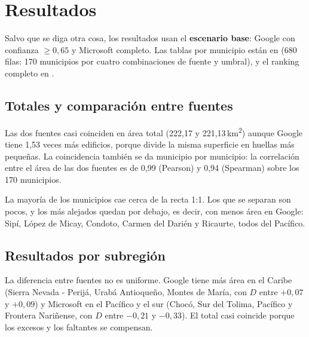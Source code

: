 \section{Resultados}
\label{sec:resultados}

Salvo que se diga otra cosa, los resultados usan el \textbf{escenario base}:
Google con confianza $\geq 0{,}65$ y Microsoft completo. Las tablas por
municipio están en  (680 filas:
170 municipios por cuatro combinaciones de fuente y umbral), y el ranking
completo en .

\subsection{Totales y comparación entre fuentes}

Las dos fuentes casi coinciden en área total (222,17 y
221,13\,km\textsuperscript{2}) aunque Google tiene 1,53 veces más edificios,
porque divide la misma superficie en huellas más pequeñas. La coincidencia
también se da municipio por municipio: la correlación entre el área de las dos
fuentes es de 0,99 (Pearson) y 0,94 (Spearman) sobre los 170 municipios.


La mayoría de los municipios cae cerca de la recta 1:1. Los que se separan son
pocos, y los más alejados quedan por debajo, es decir, con menos área en
Google: Sipí, López de Micay, Condoto, Carmen del Darién y Ricaurte, todos del
Pacífico.

\subsection{Resultados por subregión}


La diferencia entre fuentes no es uniforme. Google tiene más área en el Caribe
(Sierra Nevada - Perijá, Urabá Antioqueño, Montes de María, con $D$ entre
$+0{,}07$ y $+0{,}09$) y Microsoft en el Pacífico y el sur (Chocó, Sur del
Tolima, Pacífico y Frontera Nariñense, con $D$ entre $-0{,}21$ y $-0{,}33$). El
total casi coincide porque los excesos y los faltantes se compensan.


